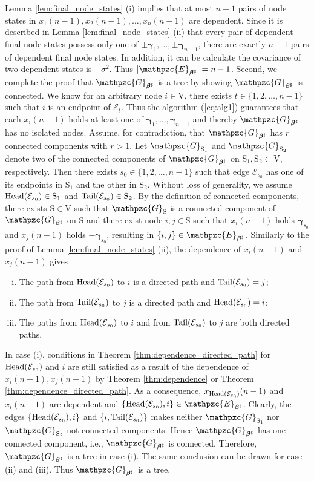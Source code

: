 \documentclass[a4paper, 11pt]{article}
\newcommand{\1}{\mathbf{1}}
\newcommand{\asf}{\mathcal{E}}
\newcommand{\Head}{\textnormal{Head}}
\newcommand{\Tail}{\textnormal{Tail}}
\newcommand{\mV}{\mathrm{V}}
\newcommand{\mGM}{\mathpzc{G}}
\newcommand{\mEM}{\mathpzc{E}}
\newcommand{\gammab}{{\bm \gamma}}
\newcommand{\mS}{\mathrm{S}}
\newcommand{\betab}{\bm{\beta}}
\begin{document}
Lemma \ref{lem:final_node_states} (i) implies that at most $n-1 $ pairs of node states in $x_1(n-1 ),x_2(n-1 ),\dots,x_n(n-1 )$ are dependent. Since it is described in Lemma \ref{lem:final_node_states} (ii) that every pair of dependent final node states possess only one of $\pm\gammab_1,\dots,\pm\gammab_{n-1 }$, there are exactly $n-1 $ pairs of dependent final node states. In addition, it can be calculate the covariance of two dependent states is $-\sigma^2$. Thus $|\mEM_{\betab^\sharp}|=n-1 $. Second, we complete the proof that $\mGM_{\betab^\sharp}$ is a tree by showing $\mGM_{\betab^\sharp}$ is connected. We know for an arbitrary node $i\in\mV$, there exists $t\in\{1,2,\dots,n-1 \}$ such that $i$ is an endpoint of $\asf_t$. Thus the algorithm (\ref{eq:alg1}) guarantees that each $x_i(n-1 )$ holds at least one of $\gammab_1,\dots,\gammab_{n-1 }$ and thereby $\mGM_{\betab^\sharp}$ has no isolated nodes. Assume, for contradiction, that $\mGM_{\betab^\sharp}$ has $r$ connected components with $r>1$. Let $\mGM_{\mathrm{S}_1}$ and $\mGM_{\mathrm{S}_2}$ denote two of the connected components of $\mGM_{\betab^\sharp}$ on $\mS_1,\mS_2\subset\mV$, respectively. Then there exists $s_0\in\{1,2,\dots,n-1 \}$ such that edge $\asf_{s_0}$ has one of its endpoints in $\mS_1$ and the other in $\mS_2$. Without loss of generality, we assume $\Head(\asf_{s_0})\in\mS_1$ and $\Tail(\asf_{s_0})\in\mS_2$. By the definition of connected components, there exists $\mS\in\mV$ such that $\mGM_{\mathrm{S}}$ is a connected component of $\mGM_{\betab^\sharp}$ on $\mathrm{S}$ and there exist node $i,j\in\mS$ such that $x_i(n-1 )$ holds $\gammab_{s_0}$ and $x_j(n-1 )$ holds $-\gammab_{s_0}$, resulting in $\{i,j\}\in\mEM_{\betab^\sharp}$. Similarly to the proof of Lemma \ref{lem:final_node_states} (ii), the dependence of $x_i(n-1 )$ and $x_j(n-1 )$ gives
\begin{enumerate}[(i)]
	\item The path from $\Head(\asf_{s_0})$ to $i$ is a directed path and $\Tail(\asf_{s_0})=j$;
	\item The path from $\Tail(\asf_{s_0})$ to $j$ is a directed path and $\Head(\asf_{s_0})=i$;
	\item The paths from $\Head(\asf_{s_0})$ to $i$ and from $\Tail(\asf_{s_0})$ to $j$ are both directed paths.
\end{enumerate}
In case (i), conditions in Theorem \ref{thm:dependence_directed_path} for $\Head(\asf_{s_0})$ and $i$ are still satisfied as a result of the dependence of $x_i(n-1 ),x_j(n-1 )$ by Theorem \ref{thm:dependence} or Theorem \ref{thm:dependence_directed_path}. As a consequence, $x_{\Head(\asf_{s_0})}(n-1 )$ and $x_i(n-1 )$ are dependent and $\{\Head(\asf_{s_0}),i\}\in\mEM_{\betab^\sharp}$. Clearly, the edges $\{\Head(\asf_{s_0}),i\}$ and $\{i,\Tail(\asf_{s_0})\}$ makes neither $\mGM_{\mathrm{S}_1}$ nor $\mGM_{\mathrm{S}_2}$ not connected components. Hence $\mGM_{\betab^\sharp}$ has one connected component, i.e., $\mGM_{\betab^\sharp}$ is connected. Therefore, $\mGM_{\betab^\sharp}$ is a tree in case (i). The same conclusion can be drawn for case (ii) and (iii). Thus $\mGM_{\betab^\sharp}$ is a tree.\\
\end{document}

